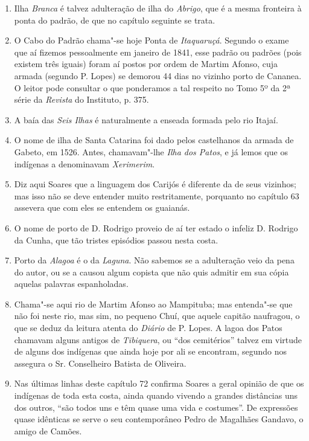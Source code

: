 \begin{enumerate}
\item Ilha \textit{Branca} é talvez adulteração de ilha do \textit{Abrigo}, que é a mesma fronteira à ponta 
do padrão, de que no capítulo seguinte se trata.

\item O Cabo do Padrão chama"-se hoje Ponta de \textit{Itaquaruçá}. Segundo o exame que aí 
fizemos pessoalmente em janeiro de 1841, esse padrão ou padrões (pois existem três 
iguais) foram aí postos por ordem de Martim Afonso, cuja armada (segundo P. Lopes) 
se demorou 44 dias no vizinho porto de Cananea. O leitor pode consultar o que 
ponderamos a tal respeito no Tomo 5º da 2ª série da \textit{Revista} do Instituto, p. 375.

\item A baía das \textit{Seis Ilhas} é naturalmente a enseada formada pelo rio Itajaí.

\item O nome de ilha de Santa Catarina foi dado pelos castelhanos da armada de Gabeto, 
em 1526. Antes, chamavam"-lhe \textit{Ilha dos Patos}, e já lemos que os indígenas a 
denominavam \textit{Xerimerim}.

\item Diz aqui Soares que a linguagem dos Carijós é diferente da de seus vizinhos; mas 
isso não se deve entender muito restritamente, porquanto no capítulo 63 assevera que 
com eles se entendem os guaianás.

\item O nome de porto de D. Rodrigo proveio de aí ter estado o infeliz D. Rodrigo da 
Cunha, que tão tristes episódios passou nesta costa.

\item Porto da \textit{Alagoa} é o da \textit{Laguna}. Não sabemos se a adulteração veio da pena do 
autor, ou se a causou algum copista que não quis admitir em sua cópia aquelas palavras 
espanholadas.

\item Chama"-se aqui rio de Martim Afonso ao Mampituba; mas entenda"-se que não foi 
neste rio, mas sim, no pequeno Chuí, que aquele capitão naufragou, o que se deduz da 
leitura atenta do \textit{Diário} de P. Lopes. A lagoa dos Patos chamavam alguns antigos de  
\textit{Tibiquera},  ou ``dos cemitérios''  talvez em virtude de alguns dos indígenas que ainda 
hoje por ali se encontram, segundo nos assegura o Sr. Conselheiro Batista de Oliveira.

\item Nas últimas linhas deste capítulo 72 confirma Soares a geral opinião de que os 
indígenas de toda esta costa, ainda quando vivendo a grandes distâncias uns dos outros, 
``são todos uns e têm quase uma vida e costumes''.  De expressões quase idênticas se 
serve o seu contemporâneo Pedro de Magalhães Gandavo, o amigo de Camões.


\end{enumerate}
